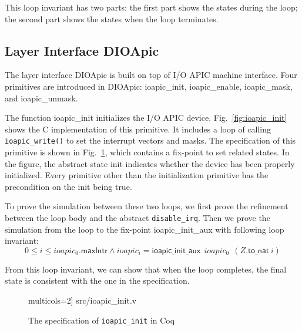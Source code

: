 This loop invariant has two parts: the first part shows the states during the
loop; the second part shows the states when the loop terminates.

\subsection{Layer Interface DIOApic}

The layer interface DIOApic is built on top of I/O APIC machine interface. Four
primitives are introduced in DIOApic: \textsf{ioapic\_init},
\textsf{ioapic\_enable}, \textsf{ioapic\_mask}, and \textsf{ioapic\_unmask}.

The function \textsf{ioapic\_init} initializes the I/O APIC device.
Fig.~\ref{fig:ioapic_init} shows the C implementation of this primitive. It
includes a loop of calling \texttt{ioapic\_write()} to set the interrupt vectors
and masks. The specification of this primitive is shown in
Fig.~\ref{fig:ioapic_init_v}, which contains a fix-point to set related states.
In the figure, the abstract state \textsf{init} indicates whether the device has
been properly initialized. Every primitive other than the initialization
primitive has the precondition on the \textsf{init} being \textsf{true}.

To prove the simulation between these two loops, we first prove the refinement
between the loop body and the abstract \texttt{disable\_irq}. Then we prove the
simulation from the loop to the fix-point \textsf{ioapic\_init\_aux} with
following loop invariant:
\[
	0 \le i \le ioapic_{0}.\mathsf{maxIntr} \wedge
	ioapic_{i} = \mathsf{ioapic\_init\_aux} ~~ioapic_{0} ~~(Z.\textsf{to\_nat}~ i)
\]

\noindent{}From this loop invariant, we can show that when the loop
completes, the final state is consistent with the one in the specification.

\begin{figure}
	 multicols=2] {src/ioapic_init.v}
	\caption{The specification of \texttt{ioapic\_init} in Coq}
	\label{fig:ioapic_init_v}
\end{figure}


